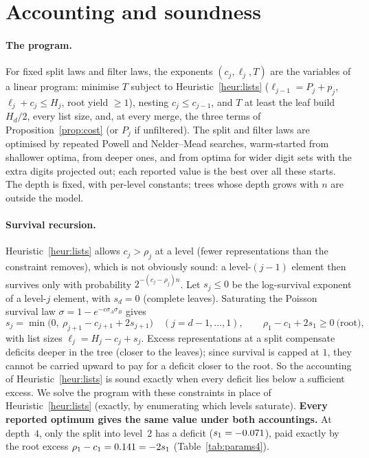 \documentclass[11pt]{article}
\theoremstyle{definition}
\theoremstyle{remark}
\begin{document}
\section{Accounting and soundness}\label{sec:sound}
\paragraph{The program.} For fixed split laws and filter laws, the exponents $(c_j,\ell_j,T)$ are the variables of a
linear program: minimise $T$ subject to Heuristic~\ref{heur:lists} ($\ell_{j-1}=P_j+p_j$, $\ell_j+c_j\le H_j$, root
yield $\ge1$), nesting $c_j\le c_{j-1}$, and $T$ at least the leaf build $H_d/2$, every list size, and, at every merge,
the three terms of Proposition~\ref{prop:cost} (or $P_j$ if unfiltered). The split and filter laws are optimised by
repeated Powell and Nelder--Mead searches, warm-started from shallower optima, from deeper ones, and from optima
for wider digit sets with the extra digits projected out; each reported value is the best over all these starts.
The depth is fixed, with per-level constants; trees whose depth grows with $n$ are outside the model.

\paragraph{Survival recursion.} Heuristic~\ref{heur:lists} allows $c_j>\rho_j$ at a level (fewer representations
than the constraint removes), which is not obviously sound: a level-$(j-1)$ element then survives only with
probability $2^{-(c_j-\rho_j)n}$. Let $s_j\le0$ be the log-survival exponent of a level-$j$ element, with $s_d=0$
(complete leaves). Saturating the Poisson survival law $\sigma=1-e^{-c\sigma_A\sigma_B}$ gives
\[
s_j=\min\bigl(0,\ \rho_{j+1}-c_{j+1}+2s_{j+1}\bigr)\quad(j=d-1,\dots,1),\qquad
\rho_1-c_1+2s_1\ge0\ \text{(root)},
\]
with list sizes $\ell_j=H_j-c_j+s_j$. Excess representations at a split compensate deficits deeper in the tree
(closer to the leaves); since survival is capped at $1$, they cannot be carried upward to pay for a deficit closer to
the root. So the accounting of Heuristic~\ref{heur:lists} is sound exactly when every deficit lies below a
sufficient excess. We solve the program with these constraints in place of
Heuristic~\ref{heur:lists} (exactly, by enumerating which levels saturate). \textbf{Every reported optimum gives the same
value under both accountings.} At depth~$4$, only the split into level~$2$ has a deficit ($s_1=-0.071$), paid exactly by the root
excess $\rho_1-c_1=0.141=-2s_1$ (Table~\ref{tab:params4}).
\end{document}
